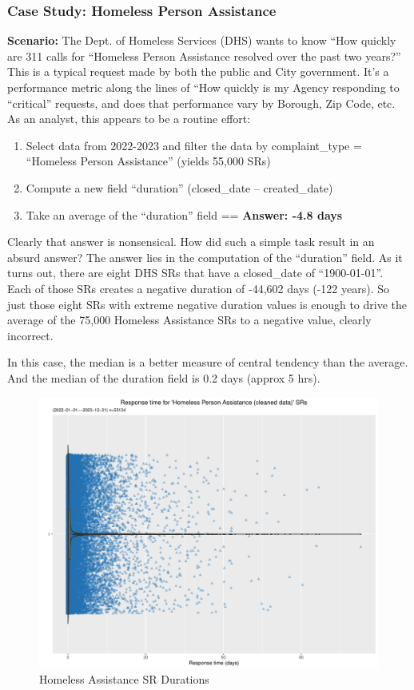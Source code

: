 \documentclass[12pt, titlepage]{article}
\begin{document}
\subsubsection{Case Study: Homeless Person Assistance}
\label{sec:homlessassistance}
\textbf{Scenario:} The Dept. of Homeless Services (DHS) wants to 
know ``How quickly are 311 calls for ``Homeless Person Assistance
resolved over the past two years?'' This is a typical request made by 
both the public and City government. It's a performance metric along 
the lines of ``How quickly is my Agency responding to ``critical'' 
requests, and does that performance vary by Borough, Zip Code, etc. 
As an analyst, this appears to be a routine effort: 
		
\begin{enumerate}
    \item Select data from 2022-2023 and filter the data by 
    complaint\_type = ``Homeless Person Assistance'' (yields 55,000 SRs)
    \item Compute a new field ``duration'' (closed\_date – created\_date)
    \item Take an average of the ``duration'' field == \textbf{Answer:  -4.8 days}  
\end{enumerate}
		
Clearly that answer is nonsensical. How did such a simple task result 
in an absurd answer? The answer lies in the computation of the ``duration'' 
field. As it turns out, there are eight DHS SRs that have a closed\_date 
of ``1900-01-01''. Each of those SRs creates a negative duration of -44,602 
days (-122 years). So just those eight SRs with extreme negative duration 
values is enough to drive the average of the 75,000 
Homeless Assistance SRs to a negative value, clearly incorrect.
		
In this case, the median is a better measure of central tendency than the average. 
And the median of the duration field is  0.2 days (approx 5 hrs). 
		
\begin{figure}[tbp]
 	 \centering
 	 \includegraphics[width = \textwidth]{homeless_response_time_clean.pdf}
	 \caption{Homeless Assistance SR Durations}
	 \label{fig:homeless}
\end{figure}
		
\end{document}

